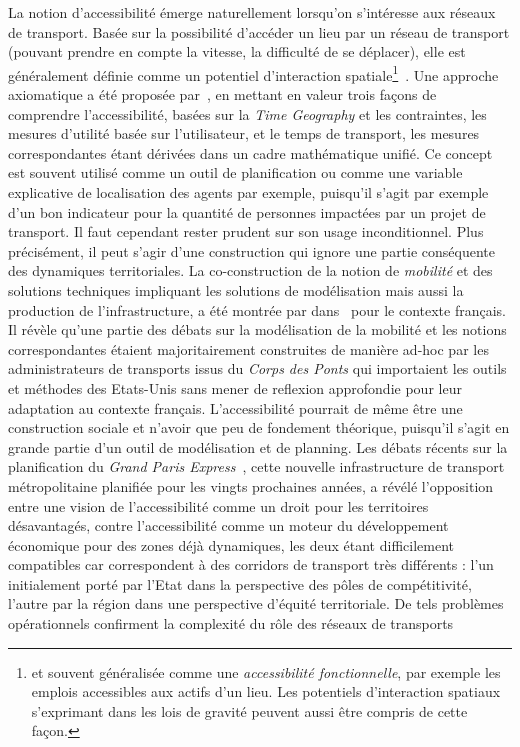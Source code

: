 {La notion d'accessibilité émerge naturellement lorsqu'on s'intéresse aux réseaux de transport. Basée sur la possibilité d'accéder un lieu par un réseau de transport (pouvant prendre en compte la vitesse, la difficulté de se déplacer), elle est généralement définie comme un potentiel d'interaction spatiale\footnote{et souvent généralisée comme une \emph{accessibilité fonctionnelle}, par exemple les emplois accessibles aux actifs d'un lieu. Les potentiels d'interaction spatiaux s'exprimant dans les lois de gravité peuvent aussi être compris de cette façon.}~\cite{bavoux2005geographie}. Une approche axiomatique a été proposée par~\cite{miller1999measuring}, en mettant en valeur trois façons de comprendre l'accessibilité, basées sur la \emph{Time Geography} et les contraintes, les mesures d'utilité basée sur l'utilisateur, et le temps de transport, les mesures correspondantes étant dérivées dans un cadre mathématique unifié. Ce concept est souvent utilisé comme un outil de planification ou comme une variable explicative de localisation des agents par exemple, puisqu'il s'agit par exemple d'un bon indicateur pour la quantité de personnes impactées par un projet de transport. Il faut cependant rester prudent sur son usage inconditionnel. Plus précisément, il peut s'agir d'une construction qui ignore une partie conséquente des dynamiques territoriales. La co-construction de la notion de \emph{mobilité} et des solutions techniques impliquant les solutions de modélisation mais aussi la production de l'infrastructure, a été montrée par  dans~\cite{commenges:tel-00923682} pour le contexte français. Il révèle qu'une partie des débats sur la modélisation de la mobilité et les notions correspondantes étaient majoritairement construites de manière ad-hoc par les administrateurs de transports issus du \emph{Corps des Ponts} qui importaient les outils et méthodes des Etats-Unis sans mener de reflexion approfondie pour leur adaptation au contexte français. L'accessibilité pourrait de même être une construction sociale et n'avoir que peu de fondement théorique, puisqu'il s'agit en grande partie d'un outil de modélisation et de planning. Les débats récents sur la planification du \emph{Grand Paris Express}~\cite{confMangin}, cette nouvelle infrastructure de transport métropolitaine planifiée pour les vingts prochaines années, a révélé l'opposition entre une vision de l'accessibilité comme un droit pour les territoires désavantagés, contre l'accessibilité comme un moteur du développement économique pour des zones déjà dynamiques, les deux étant difficilement compatibles car correspondent à des corridors de transport très différents : l'un initialement porté par l'Etat dans la perspective des pôles de compétitivité, l'autre par la région dans une perspective d'équité territoriale. De tels problèmes opérationnels confirment la complexité du rôle des réseaux de transports }
